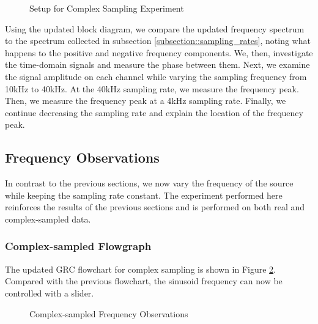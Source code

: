 \documentclass{article}
\begin{document}
\begin{figure}[H]
	\centerline{}
	\caption{Setup for Complex Sampling Experiment}
	\label{fig::complex_sampling_experiment}
\end{figure}

Using the updated block diagram, we compare the updated frequency spectrum to the spectrum collected in subsection \ref{subsection::sampling_rates}, noting what happens to the positive and negative frequency components. We, then, investigate the time-domain signals and measure the phase between them. Next, we examine the signal amplitude on each channel while varying the sampling frequency from 10kHz to 40kHz. At the 40kHz sampling rate, we measure the frequency peak. Then, we measure the frequency peak at a 4kHz sampling rate. Finally, we continue decreasing the sampling rate and explain the location of the frequency peak.

\subsection{Frequency Observations}

In contrast to the previous sections, we now vary the frequency of the source while keeping the sampling rate constant. The experiment performed here reinforces the results of the previous sections and is performed on both real and complex-sampled data.
 
\subsubsection{Complex-sampled Flowgraph \label{subsection::frequency_observations_complex_sampling}}

The updated GRC flowchart for complex sampling is shown in Figure \ref{fig::frequency_observations_complex_sampling}. Compared with the previous flowchart, the sinusoid frequency can now be controlled with a slider.

\begin{figure}[H]
	\centerline{}
	\caption{Complex-sampled Frequency Observations}
	\label{fig::frequency_observations_complex_sampling}
\end{figure}
\end{document}
